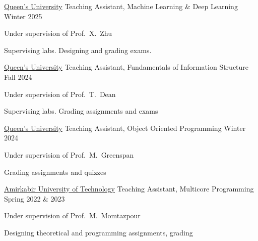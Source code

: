 
\begin{cventries}

\cventry
    {\href{https://www.queensu.ca/}{Queen's University}} %
    {Teaching Assistant, Machine Learning \& Deep Learning} %
    {} %
    {Winter 2025} %
    {
      \begin{cvitems} %
        \item {Under supervision of Prof.~X.~Zhu}
        \item {Supervising labs. Designing and grading exams.}
      \end{cvitems}
    }

\cventry
    {\href{https://www.queensu.ca/}{Queen's University}} %
    {Teaching Assistant, Fundamentals of Information Structure} %
    {} %
    {Fall 2024} %
    {
      \begin{cvitems} %
        \item {Under supervision of Prof.~T.~Dean}
        \item {Supervising labs. Grading assignments and exams}
      \end{cvitems}
    }


\cventry
    {\href{https://www.queensu.ca/}{Queen's University}} %
    {Teaching Assistant, Object Oriented Programming} %
    {} %
    {Winter 2024} %
    {
      \begin{cvitems} %
        \item {Under supervision of Prof.~M.~Greenspan}
        \item {Grading assignments and quizzes}
      \end{cvitems}
    }

\cventry
    {\href{https://aut.ac.ir/}{Amirkabir University of Technology}} %
    {Teaching Assistant, Multicore Programming} %
    {} %
    {Spring 2022 \& 2023} %
    {
      \begin{cvitems} %
        \item {Under supervision of Prof.~M.~Momtazpour}
        \item {Designing theoretical and programming assignments, grading}
      \end{cvitems}
    }


\end{cventries}
